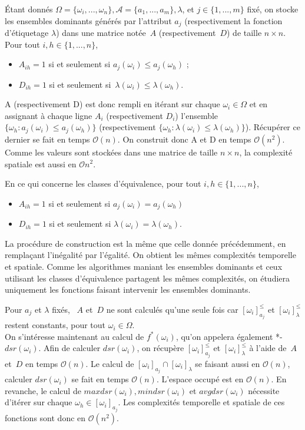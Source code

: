 \documentclass[a4paper]{article}
\begin{document}
Étant donnés $\Omega = \{\omega_i, ... , \omega_n\}, \mathcal{A} = \{a_1, ...,
a_m\}, \lambda$, et $j \in \{1, ..., m\}$ fixé, on stocke les ensembles
dominants générés par l'attribut $a_j$ (respectivement la fonction d'étiquetage $\lambda$) dans une matrice notée~$A$ (respectivement~$D$) de taille $n \times n$. Pour tout $i,
h \in \{1,...,n\}$,
\begin{itemize} 
    \item $A_{ih} = 1$ si et seulement si $a_j(\omega_i) \leq
a_j(\omega_h)$ ;
    \item $D_{ih}= 1$ si et seulement si~$\lambda(\omega_i) \leq \lambda(\omega_h)$.
\end{itemize}
A (respectivement D) est donc rempli en itérant sur chaque $\omega_i \in \Omega$
et en assignant à chaque ligne $A_i$ (respectivement $D_i$) l'ensemble
$\{\omega_h : a_j(\omega_i) \leq a_j(\omega_h)\}$ (respectivement $\{\omega_h :
\lambda(\omega_i) \leq \lambda(\omega_h)\}$). Récupérer ce dernier se fait en
temps $\mathcal{O}(n)$. On construit donc A et D en temps $\mathcal{O}(n^2)$.
Comme les valeurs sont stockées dans une matrice de taille $n \times n$, la
complexité spatiale est aussi en $\mathcal{O}{n^2}$.

En ce qui concerne les classes d'équivalence, pour tout $i, h \in \{1,...,n\}$,
\begin{itemize}
    \item $A_{ih} = 1$ si et seulement si $a_j(\omega_i) = a_j(\omega_h)$
    \item $D_{ih} = 1$ si et seulement si $\lambda(\omega_i) = \lambda(\omega_h)$. 
\end{itemize}
La procédure de construction est la même que celle donnée
précédemment, en remplaçant l'inégalité par l'égalité. On obtient les mêmes
complexités temporelle et spatiale. Comme les algorithmes maniant les ensembles
dominants et ceux utilisant les classes d'équivalence partagent les mêmes
complexités, on étudiera uniquement les fonctions faisant intervenir les
ensembles dominants. 

Pour $a_j$ et $\lambda$ fixés, ~$A$ et~$D$ ne sont calculés qu'une seule fois car
$[\omega_i]^{\leq}_{a_j}$ et $[\omega_i]^{\leq}_{\lambda}$ restent constants,
pour tout $\omega_i \in \Omega$. \\

On s'intéresse maintenant au calcul de $f^*(\omega_i)$, qu'on appelera également
*-$dsr(\omega_i)$.
Afin de calculer $dsr(\omega_i)$, on récupère $[\omega_i]^{\leq}_{a_j}$ et
$[\omega_i]^{\leq}_{\lambda}$ à l'aide de~$A$ et~$D$ en temps $\mathcal{O}(n)$. Le calcul de
$[\omega_i]_{a_j} \cap [\omega_i]_{\lambda}$ se faisant aussi en $\mathcal{O}(n)$,
calculer $dsr(\omega_i)$ se fait en temps $\mathcal{O}(n)$. L'espace occupé est
en $\mathcal{O}(n)$.
En revanche, le calcul de $maxdsr(\omega_i), mindsr(\omega_i)$ et
$avgdsr(\omega_i)$ nécessite d'itérer sur chaque $\omega_h \in
[\omega_i]_{a_j}$. Les complexités temporelle et spatiale de ces fonctions sont
donc en $\mathcal{O}(n^2).$ \\
\end{document}
